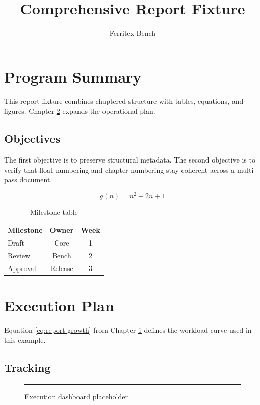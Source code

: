 \documentclass{report}
\title{Comprehensive Report Fixture}
\author{Ferritex Bench}
\begin{document}
\maketitle
\tableofcontents

\chapter{Program Summary}\label{chap:summary}
This report fixture combines chaptered structure with tables, equations, and figures. Chapter \ref{chap:execution} expands the operational plan.

\section{Objectives}
The first objective is to preserve structural metadata. The second objective is to verify that float numbering and chapter numbering stay coherent across a multi-pass document.

\begin{equation}\label{eq:report-growth}
g(n) = n^2 + 2n + 1
\end{equation}

\begin{table}[h]
\caption{Milestone table}
\label{tab:milestones}
\begin{tabular}{|l|c|c|}
\hline
Milestone & Owner & Week \\
\hline
Draft & Core & 1 \\
Review & Bench & 2 \\
Approval & Release & 3 \\
\hline
\end{tabular}
\end{table}

\chapter{Execution Plan}\label{chap:execution}
Equation \ref{eq:report-growth} from Chapter \ref{chap:summary} defines the workload curve used in this example.

\section{Tracking}
\begin{figure}[h]
\begin{center}
\rule{4.0in}{1.8in}
\end{center}
\caption{Execution dashboard placeholder}
\label{fig:dashboard}
\end{figure}
\end{document}
